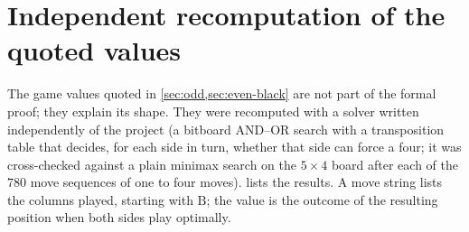 \documentclass[11pt,a4paper]{article}
\theoremstyle{plain}
\theoremstyle{definition}
\newcommand{\B}{\mathrm{B}}
\begin{document}
\section{Independent recomputation of the quoted values}
\label{app:recheck}

The game values quoted in \cref{sec:odd,sec:even-black} are not part of the formal proof; they explain its shape. They were recomputed with a solver written independently of the project (a bitboard AND--OR search with a transposition table that decides, for each side in turn, whether that side can force a four; it was cross-checked against a plain minimax search on the $5\times 4$ board after each of the $780$ move sequences of one to four moves).  lists the results. A move string lists the columns played, starting with $\B$; the value is the outcome of the resulting position when both sides play optimally.
\end{document}
